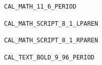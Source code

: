 \documentclass[UTF8,a4paper,11pt,openany]{ctexbook}
\begin{document}
\noindent\texttt{CAL\_MATH\_11\_6\_PERIOD}\par\vspace{5pt}
\noindent\texttt{CAL\_MATH\_SCRIPT\_8\_1\_LPAREN}\hspace{36pt}{\fontsize{8.1pt}{9.3pt}\selectfont $($}\par\vspace{5pt}
\noindent\texttt{CAL\_MATH\_SCRIPT\_8\_1\_RPAREN}\hspace{36pt}{\fontsize{8.1pt}{9.3pt}\selectfont $)$}\par\vspace{5pt}
\noindent\texttt{CAL\_TEXT\_BOLD\_9\_96\_PERIOD}\hspace{36pt}{\small\bfseries 0.3}\par
\end{document}
